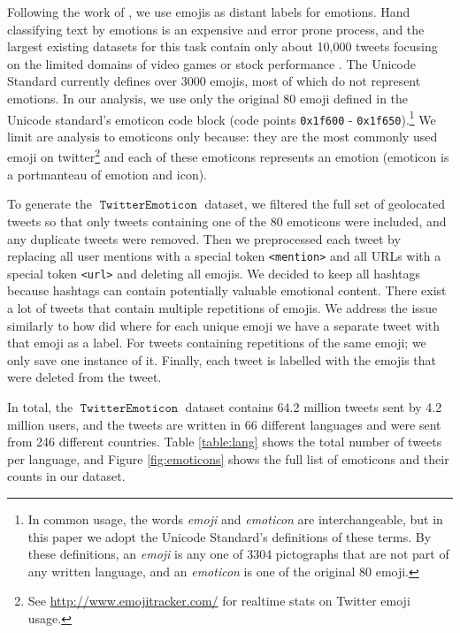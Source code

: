 \documentclass[11pt]{article}
\newcommand{\defn}[1]{\emph{{#1}}}
\DeclareMathOperator{\emoticon}{\texttt{TwitterEmoticon}}
\begin{document}
Following the work of \citet{fixme1,fixme2,fixme3}, we use emojis as distant labels for emotions.
Hand classifying text by emotions is an expensive and error prone process,
and the largest existing datasets for this task contain only about 10,000 tweets focusing on the limited domains of video games \citep{fixme} or stock performance \citep{fixme}.
The Unicode Standard \citep{fixme} currently defines over 3000 emojis,
most of which do not represent emotions.
In our analysis, we use only the original 80 emoji defined in the Unicode standard's emoticon code block (code points \texttt{0x1f600} - \texttt{0x1f650}).\footnote{
    In common usage, the words \defn{emoji} and \defn{emoticon} are interchangeable,
    but in this paper we adopt the Unicode Standard's definitions of these terms.
    By these definitions, an \defn{emoji} is any one of 3304 pictographs that are not part of any written language,
    and an \defn{emoticon} is one of the original 80 emoji.
}
We limit are analysis to emoticons only because:
they are the most commonly used emoji on twitter\footnote{
    See \url{http://www.emojitracker.com/} for realtime stats on Twitter emoji usage.
}
and each of these emoticons represents an emotion (emoticon is a portmanteau of emotion and icon).

To generate the $\emoticon$ dataset, 
we filtered the full set of geolocated tweets so that only tweets containing one of the 80 emoticons were included,
and any duplicate tweets were removed.
Then we preprocessed each tweet by replacing all user mentions with a special token \texttt{<mention>} and all URLs with a special token \texttt{<url>} and deleting all emojis.
We decided to keep all hashtags because hashtags can contain potentially valuable emotional content.
There exist a lot of tweets that contain multiple repetitions of emojis.
We address the issue similarly to how \cite{100 million tweets} did where for each unique emoji we have a separate tweet with that emoji as a label. 
For tweets containing repetitions of the same emoji; we only save one instance of it.
Finally, each tweet is labelled with the emojis that were deleted from the tweet.

In total, the $\emoticon$ dataset contains 64.2 million tweets sent by 4.2 million users,
and the tweets are written in 66 different languages and were sent from 246 different countries.
Table \ref{table:lang} shows the total number of tweets per language,
and Figure \ref{fig:emoticons} shows the full list of emoticons and their counts in our dataset. 
\end{document}
